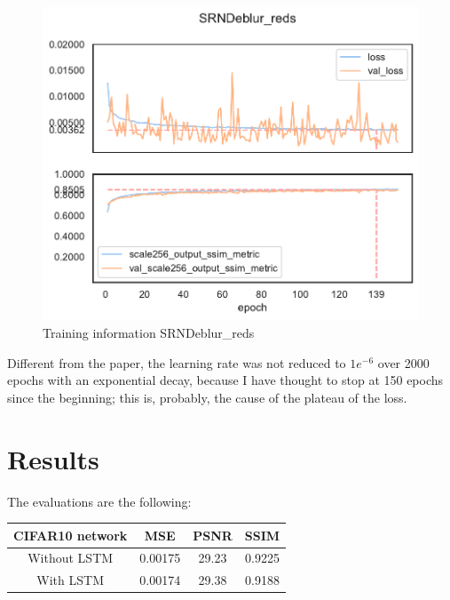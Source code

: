 \begin{figure}[H]
    \centering
    \includegraphics[scale=0.35]{subsections/srndeblur/plot_history_SRNDeblur_reds.pdf}
    \caption{Training information SRNDeblur\_reds}
\end{figure}

Different from the paper, the learning rate was not reduced to $1e^{-6}$ over 2000 epochs with an exponential decay, because  I have thought to stop at 150 epochs since the beginning; this is, probably, the cause of the plateau of the loss.

\section{Results}
The evaluations are the following:

\begin{tabularx}{300pt}{cccc}
            CIFAR10 network & MSE & PSNR & SSIM \\
            \hline
            \textnormal{Without LSTM} & 0.00175 & 29.23 & 0.9225 \\
            \textnormal{With LSTM} & 0.00174 & 29.38 & 0.9188 \\
            \hline
\end{tabularx}

